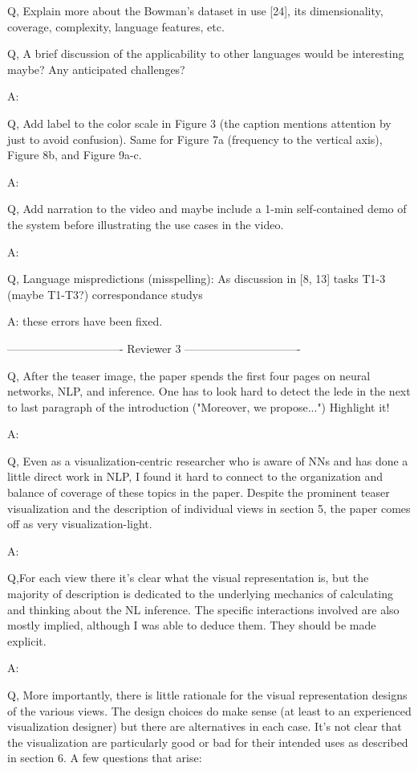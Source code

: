 Q, Explain more about the Bowman's dataset in use [24], its dimensionality, coverage, complexity, language features, etc.

Q, A brief discussion of the applicability to other languages would be interesting maybe? Any anticipated challenges?

A:

Q, Add label to the color scale in Figure 3 (the caption mentions attention by just to avoid confusion). Same for Figure 7a (frequency to the vertical axis), Figure 8b, and Figure 9a-c.

A:

Q, Add narration to the video and maybe include a 1-min self-contained demo of the system before illustrating the use cases in the video.

A:

Q, Language mispredictions (misspelling):
As discussion in [8, 13]
tasks T1-3 (maybe T1-T3?)
correspondance
studys

A: these errors have been fixed.

------------------------------- Reviewer 3 -------------------------------

Q, After the teaser image, the paper spends the first four pages on neural networks, NLP, and inference. One has to look hard to detect the lede in the next to last paragraph of the introduction ("Moreover, we propose...") Highlight it!

A:

Q, Even as a visualization-centric researcher who is aware of NNs and has done a little direct work in NLP, I found it hard to connect to the organization and balance of coverage of these topics in the paper. Despite the prominent teaser visualization and the description of individual views in section 5, the paper comes off as very visualization-light.

A:

Q,For each view there it's clear what the visual representation is, but the majority of description is dedicated to the underlying mechanics of calculating and thinking about the NL inference. The specific interactions involved are also mostly implied, although I was able to deduce them. They should be made explicit.

A:

Q, More importantly, there is little rationale for the visual representation designs of the various views. The design choices do make sense (at least to an experienced visualization designer) but there are alternatives in each case. It's not clear that the visualization are particularly good or bad for their intended uses as described in section 6. A few questions that arise:

